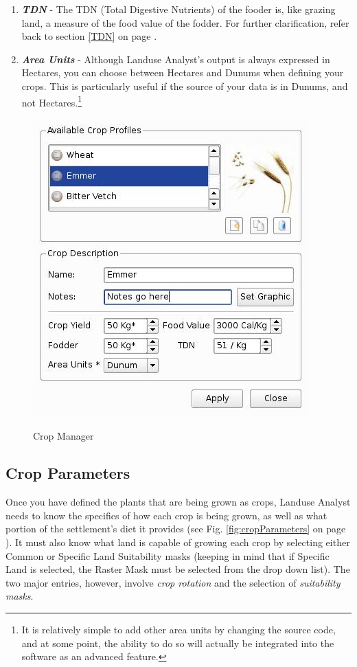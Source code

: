 \begin{enumerate}
      \item \textbf{\textit{TDN}} - The TDN (Total Digestive Nutrients) of the
fooder is, like grazing land, a measure of the food value of the fodder.  For
further clarification, refer back to section \ref{TDN} on page \pageref{TDN}.

      \item \textbf{\textit{Area Units}} - Although Landuse Analyst's output is
always expressed in Hectares, you can choose between Hectares and Dunums when
defining your crops.  This is particularly useful if the source of your data is
in Dunums, and not Hectares.\footnote{It is relatively simple to add other area
units by changing the source code, and at some point, the ability to do so will
actually be integrated into the software as an advanced feature.}
    \end{enumerate}

      \begin{figure}[htbp]
        \includegraphics[scale=.6]{./images/cropManager.jpg}
      \label{fig:cropManager} \caption{Crop Manager}
    \end{figure}


  \subsection{Crop Parameters}
  \label{cropParameters}
  Once you have defined the plants that are being grown as crops, Landuse
Analyst needs to know the specifics of how each crop is being grown, as well as
what portion of the settlement's diet it provides (see Fig.
\ref{fig:cropParameters} on page \pageref{fig:cropParameters}).  It must also
know what land is capable of growing each crop by selecting either Common or
Specific Land Suitability masks (keeping in mind that if Specific Land is
selected, the Raster Mask must be selected from the drop down list).  The two
major entries, however, involve \textit{crop rotation} and the selection of
\textit{suitability masks}.

